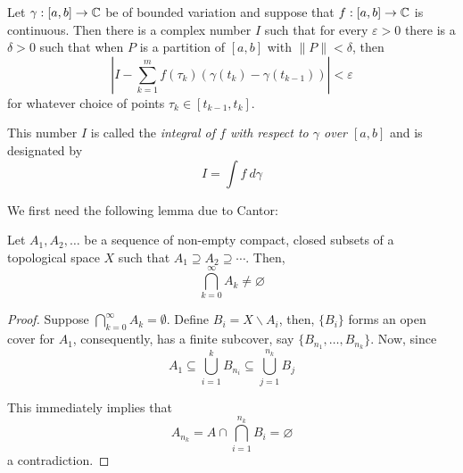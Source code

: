 \begin{theorem}
    Let $\gamma: [a,b]\to\mathbb{C}$ be of bounded variation and suppose that $f:[a,b]\to\mathbb{C}$ is continuous. Then there is a complex number $I$ such that for every $\varepsilon > 0$ there is a $\delta > 0$ such that when $P$ is a partition of $[a,b]$ with $\|P\| < \delta$, then 
    \begin{equation*}
        \left|I - \sum_{k = 1}^m f(\tau_k)(\gamma(t_k) - \gamma(t_{k - 1}))\right| < \varepsilon
    \end{equation*}
    for whatever choice of points $\tau_k\in[t_{k - 1}, t_k]$.
\end{theorem}

This number $I$ is called the \textit{integral of $f$ with respect to $\gamma$ over $[a,b]$} and is designated by 
\begin{equation*}
    I = \int f~d\gamma
\end{equation*}

We first need the following lemma due to Cantor: 
\begin{lemma}[Cantor]
    Let $A_1,A_2,\ldots$ be a sequence of non-empty compact, closed subsets of a topological space $X$ such that $A_1\supseteq A_2\supseteq\cdots$. Then, 
    \begin{equation*}
        \bigcap_{k = 0}^\infty A_k\ne\varnothing
    \end{equation*}
\end{lemma}
\begin{proof}
    Suppose $\bigcap\limits_{k = 0}^\infty A_k = \emptyset$. Define $B_i = X\backslash A_i$, then, $\{B_i\}$ forms an open cover for $A_1$, consequently, has a finite subcover, say $\{B_{n_1},\ldots,B_{n_k}\}$. Now, since 
    \begin{equation*}
        A_1\subseteq\bigcup_{i = 1}^kB_{n_i}\subseteq\bigcup_{j = 1}^{n_k}B_j
    \end{equation*}

    This immediately implies that 
    \begin{equation*}
        A_{n_k} = A\cap\bigcap_{i = 1}^{n_k}B_i = \varnothing
    \end{equation*}
    a contradiction.
\end{proof}

